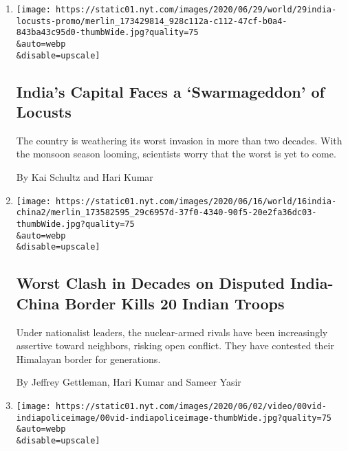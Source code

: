 \begin{enumerate}
\def\labelenumi{\arabic{enumi}.}
\item
  \href{/2020/06/29/world/asia/india-new-delhi-locusts.html}{}

  \texttt{[image: https://static01.nyt.com/images/2020/06/29/world/29india-locusts-promo/merlin\_173429814\_928c112a-c112-47cf-b0a4-843ba43c95d0-thumbWide.jpg?quality=75\\\&auto=webp\\\&disable=upscale]}

  \hypertarget{indias-capital-faces-a-swarmageddon-of-locusts}{%
  \subsection{India's Capital Faces a `Swarmageddon' of
  Locusts}\label{indias-capital-faces-a-swarmageddon-of-locusts}}

  The country is weathering its worst invasion in more than two decades.
  With the monsoon season looming, scientists worry that the worst is
  yet to come.

  By Kai Schultz and Hari Kumar
\item
  \href{/2020/06/16/world/asia/indian-china-border-clash.html}{}

  \texttt{[image: https://static01.nyt.com/images/2020/06/16/world/16india-china2/merlin\_173582595\_29c6957d-37f0-4340-90f5-20e2fa36dc03-thumbWide.jpg?quality=75\\\&auto=webp\\\&disable=upscale]}

  \hypertarget{worst-clash-in-decades-on-disputed-india-china-border-kills-20-indian-troops}{%
  \subsection{Worst Clash in Decades on Disputed India-China Border
  Kills 20 Indian
  Troops}\label{worst-clash-in-decades-on-disputed-india-china-border-kills-20-indian-troops}}

  Under nationalist leaders, the nuclear-armed rivals have been
  increasingly assertive toward neighbors, risking open conflict. They
  have contested their Himalayan border for generations.

  By Jeffrey Gettleman, Hari Kumar and Sameer Yasir
\item
  \href{/video/world/100000007141490/-india-police-pandemic-coronavirus.html}{}

  \texttt{[image: https://static01.nyt.com/images/2020/06/02/video/00vid-indiapoliceimage/00vid-indiapoliceimage-thumbWide.jpg?quality=75\\\&auto=webp\\\&disable=upscale]}


\end{enumerate}
